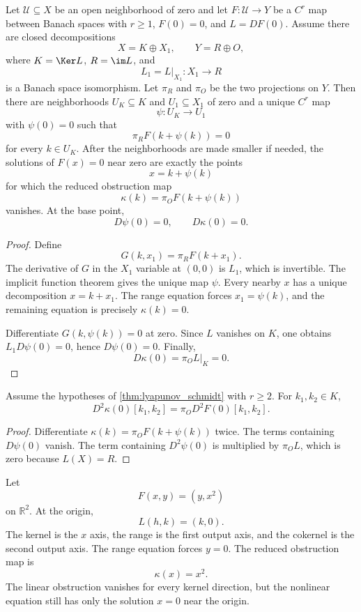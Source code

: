 \begin{theorem}\label{thm:lyapunov_schmidt}
Let $\mathcal U\subseteq X$ be an open neighborhood of zero and let $F:\mathcal U\to Y$ be a $C^r$ map between Banach spaces with $r\ge1$, $F(0)=0$, and $L=DF(0)$.  Assume there are closed decompositions
\[
X=K\oplus X_1,
\qquad
Y=R\oplus O,
\]
where $K=\Ker L$, $R=\im L$, and
\[
L_1=L|_{X_1}:X_1\longrightarrow R
\]
is a Banach space isomorphism.  Let $\pi_R$ and $\pi_O$ be the two projections on $Y$.  Then there are neighborhoods $U_K\subseteq K$ and $U_1\subseteq X_1$ of zero and a unique $C^r$ map
\[
\psi:U_K\longrightarrow U_1
\]
with $\psi(0)=0$ such that
\[
\pi_RF(k+\psi(k))=0
\]
for every $k\in U_K$.  After the neighborhoods are made smaller if needed, the solutions of $F(x)=0$ near zero are exactly the points
\[
x=k+\psi(k)
\]
for which the reduced obstruction map
\[
\kappa(k)=\pi_OF(k+\psi(k))
\]
vanishes.  At the base point,
\[
D\psi(0)=0,
\qquad
D\kappa(0)=0.
\]
\end{theorem}

\begin{proof}
Define
\[
G(k,x_1)=\pi_RF(k+x_1).
\]
The derivative of $G$ in the $X_1$ variable at $(0,0)$ is $L_1$, which is invertible.  The implicit function theorem gives the unique map $\psi$.  Every nearby $x$ has a unique decomposition $x=k+x_1$.  The range equation forces $x_1=\psi(k)$, and the remaining equation is precisely $\kappa(k)=0$.

Differentiate $G(k,\psi(k))=0$ at zero.  Since $L$ vanishes on $K$, one obtains $L_1D\psi(0)=0$, hence $D\psi(0)=0$.  Finally,
\[
D\kappa(0)=\pi_OL|_K=0.
\]
\end{proof}


\begin{corollary}\label{cor:quadratic_reduced_obstruction}
Assume the hypotheses of \cref{thm:lyapunov_schmidt} with $r\ge2$.  For $k_1,k_2\in K$,
\[
D^2\kappa(0)[k_1,k_2]
=
\pi_O D^2F(0)[k_1,k_2].
\]
\end{corollary}

\begin{proof}
Differentiate $\kappa(k)=\pi_OF(k+\psi(k))$ twice.  The terms containing $D\psi(0)$ vanish.  The term containing $D^2\psi(0)$ is multiplied by $\pi_OL$, which is zero because $L(X)=R$.
\end{proof}

\begin{example}\label{ex:pure_quadratic_obstruction}
Let
\[
F(x,y)=(y,x^2)
\]
on $\mathbb R^2$.  At the origin,
\[
L(h,k)=(k,0).
\]
The kernel is the $x$ axis, the range is the first output axis, and the cokernel is the second output axis.  The range equation forces $y=0$.  The reduced obstruction map is
\[
\kappa(x)=x^2.
\]
The linear obstruction vanishes for every kernel direction, but the nonlinear equation still has only the solution $x=0$ near the origin.
\end{example}

